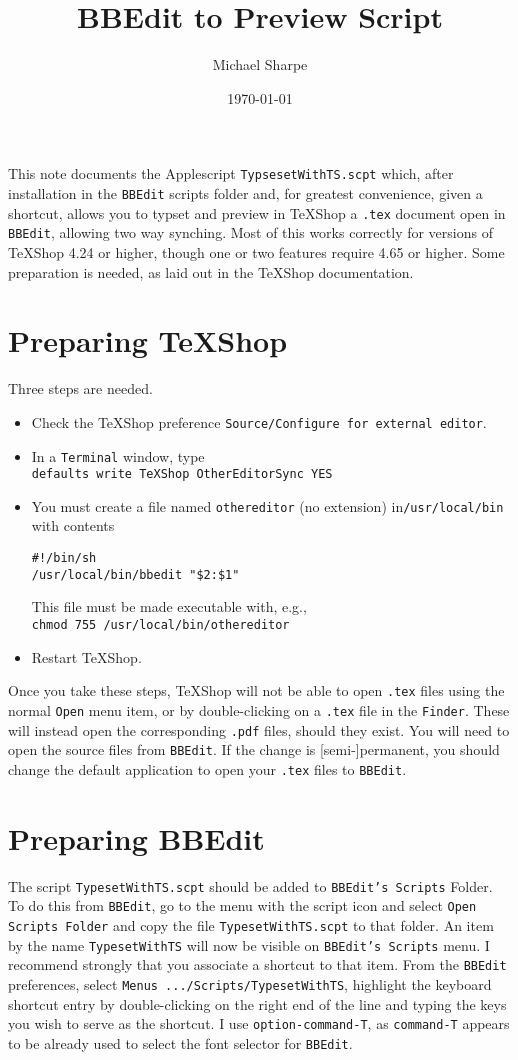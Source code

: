 \documentclass[11pt]{amsart}
\title{BBEdit to \TeXShop Preview Script}
\author{Michael Sharpe}
\date{\today}  %
\def\TeXShop{\TeX Shop\xspace}
\begin{document}
\maketitle
This note documents the Applescript {\tt TypsesetWithTS.scpt} which, after installation in  the {\tt BBEdit} scripts folder and, for greatest convenience, given a shortcut, allows you to typset and preview in \TeXShop a {\tt.tex} document open in {\tt BBEdit}, allowing two way synching. Most of this works  correctly for versions of \TeXShop 4.24 or higher,  though one or two features require 4.65 or higher. Some preparation is needed, as laid out  in the \TeXShop documentation. 

\section{Preparing \TeXShop}
Three steps are needed.
\begin{itemize}
\item Check the \TeXShop preference {\tt Source/Configure for external editor}.
\item In a {\tt Terminal} window, type\\
\verb|defaults write TeXShop OtherEditorSync YES|\\
\item You must create a file named {\tt othereditor} (no extension) in\verb|/usr/local/bin| with contents
\begin{verbatim}
#!/bin/sh
/usr/local/bin/bbedit "$2:$1"  
\end{verbatim}
This file must be made executable with, e.g.,\\
\verb|chmod 755 /usr/local/bin/othereditor|
\item Restart \TeXShop.  
\end{itemize}
Once you take these steps, \TeXShop will not be able to  open {\tt.tex} files using the   normal {\tt Open} menu item, or by double-clicking on a {\tt.tex} file in the {\tt Finder}. These will instead open the corresponding {\tt.pdf} files, should they exist. 
You will need to open  the source files from {\tt BBEdit}. If the change is [semi-]permanent, you should change the default application to open your {\tt.tex} files to {\tt BBEdit}. 
\section{Preparing BBEdit}
The script {\tt TypesetWithTS.scpt} should be added to {\tt BBEdit's Scripts} Folder. To do this from {\tt BBEdit}, go to the menu with the script icon and select {\tt Open Scripts Folder} and copy the file {\tt TypesetWithTS.scpt} to that folder. An item by the name {\tt TypesetWithTS} will now be visible on {\tt BBEdit's Scripts} menu. I recommend strongly that you associate a shortcut to that item. From the {\tt BBEdit} preferences, select {\tt Menus .../Scripts/TypesetWithTS}, highlight the keyboard shortcut entry by double-clicking on the right end of the line and typing the keys you wish to serve as the shortcut. I use {\tt option-command-T}, as  {\tt command-T} appears to be already used to select the font selector for {\tt BBEdit}.
\end{document}
